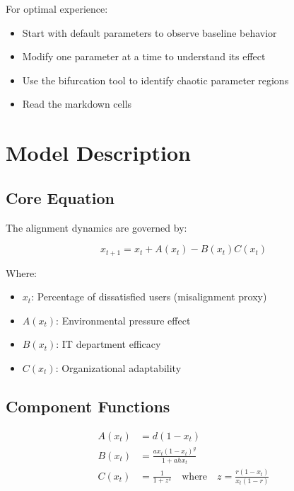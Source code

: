 \documentclass[a4paper, 10pt]{article}
\begin{document}
For optimal experience:
\begin{itemize}
	\item Start with default parameters to observe baseline behavior
	\item Modify one parameter at a time to understand its effect
	\item Use the bifurcation tool to identify chaotic parameter regions
	\item Read the markdown cells
\end{itemize}

\clearpage
\section{Model Description}
\subsection{Core Equation}
The alignment dynamics are governed by:

\begin{equation}
	x_{t + 1} = x_t + A(x_t) - B(x_t)C(x_t)
\end{equation}

Where:
\begin{itemize}
	\item $x_t$: Percentage of dissatisfied users (misalignment proxy)
	\item $A(x_t)$: Environmental pressure effect
	\item $B(x_t)$: IT department efficacy
	\item $C(x_t)$: Organizational adaptability
\end{itemize}

\subsection{Component Functions}
\begin{align}
	A(x_t) & = d(1 - x_t)                                                                     \\
	B(x_t) & = \frac{a x_t (1 - x_t)^g}{1 + a h x_t}                                          \\
	C(x_t) & = \frac{1}{1 + z^s} \quad \text{where} \quad z = \frac{r (1 - x_t)}{x_t (1 - r)}
\end{align}
\end{document}
